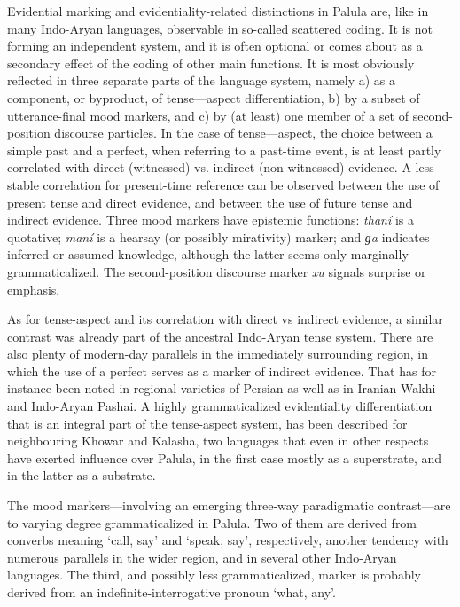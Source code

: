 \documentclass[output=paper]{langsci/langscibook}
\begin{document}
Evidential marking and evidentiality-related distinctions in Palula are, like in many Indo-Aryan languages, observable in so-called scattered coding. It is not forming an independent system, and it is often optional or comes about as a secondary effect of the coding of other main functions. It is most obviously reflected in three separate parts of the language system, namely a) as a component, or byproduct, of tense—aspect differentiation, b) by a subset of utterance-final mood markers, and c) by (at least) one member of a set of second-position discourse particles. In the case of tense—aspect, the choice between a simple past and a perfect, when referring to a past-time event, is at least partly correlated with direct (witnessed) vs. indirect (non-witnessed) evidence. A less stable correlation for present-time reference can be observed between the use of present tense and direct evidence, and between the use of future tense and indirect evidence.  Three mood markers have epistemic functions: \textit{thaní} is a quotative; \textit{maní} is a hearsay (or possibly mirativity) marker; and \textit{ɡa} indicates inferred or assumed knowledge, although the latter seems only marginally grammaticalized. The second-position discourse marker \textit{xu} signals surprise or emphasis.

As for tense-aspect and its correlation with direct vs indirect evidence, a similar contrast was already part of the ancestral Indo-Aryan tense system. There are also plenty of modern-day parallels in the immediately surrounding region, in which the use of a perfect serves as a marker of indirect evidence. That has for instance been noted in regional varieties of Persian as well as in Iranian Wakhi and Indo-Aryan Pashai. A highly grammaticalized evidentiality differentiation that is an integral part of the tense-aspect system, has been described for neighbouring Khowar and Kalasha, two languages that even in other respects have exerted influence over Palula, in the first case mostly as a superstrate, and in the latter as a substrate. 

The mood markers—involving an emerging three-way paradigmatic contrast—are to varying degree grammaticalized in Palula. Two of them are derived from converbs meaning ‘call, say’ and ‘speak, say’, respectively, another tendency with numerous parallels in the wider region, and in several other Indo-Aryan languages. The third, and possibly less grammaticalized, marker is probably derived from an indefinite-interrogative pronoun ‘what, any’.  
\end{document}
